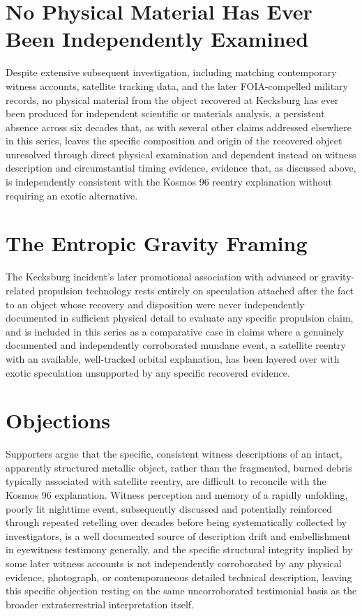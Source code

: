 \documentclass[11pt]{article}
\begin{document}
\section{No Physical Material Has Ever Been Independently Examined}

Despite extensive subsequent investigation, including matching contemporary witness accounts, satellite tracking data, and the later FOIA-compelled military records, no physical material from the object recovered at Kecksburg has ever been produced for independent scientific or materials analysis, a persistent absence across six decades that, as with several other claims addressed elsewhere in this series, leaves the specific composition and origin of the recovered object unresolved through direct physical examination and dependent instead on witness description and circumstantial timing evidence, evidence that, as discussed above, is independently consistent with the Kosmos 96 reentry explanation without requiring an exotic alternative.

\section{The Entropic Gravity Framing}

The Kecksburg incident's later promotional association with advanced or gravity-related propulsion technology rests entirely on speculation attached after the fact to an object whose recovery and disposition were never independently documented in sufficient physical detail to evaluate any specific propulsion claim, and is included in this series as a comparative case in claims where a genuinely documented and independently corroborated mundane event, a satellite reentry with an available, well-tracked orbital explanation, has been layered over with exotic speculation unsupported by any specific recovered evidence.

\section{Objections}

Supporters argue that the specific, consistent witness descriptions of an intact, apparently structured metallic object, rather than the fragmented, burned debris typically associated with satellite reentry, are difficult to reconcile with the Kosmos 96 explanation. Witness perception and memory of a rapidly unfolding, poorly lit nighttime event, subsequently discussed and potentially reinforced through repeated retelling over decades before being systematically collected by investigators, is a well documented source of description drift and embellishment in eyewitness testimony generally, and the specific structural integrity implied by some later witness accounts is not independently corroborated by any physical evidence, photograph, or contemporaneous detailed technical description, leaving this specific objection resting on the same uncorroborated testimonial basis as the broader extraterrestrial interpretation itself.
\end{document}
